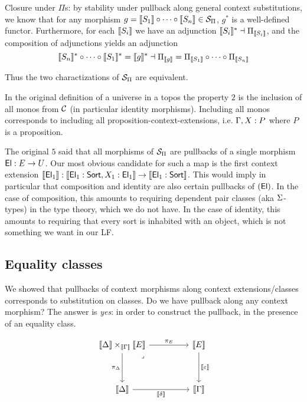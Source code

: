 Closure under $\Pi$s: by stability under pullback along general context substitutions,
we know that for any morphism $g = \llbracket S_{1} \rrbracket \circ \cdots \circ \llbracket S_{n} \rrbracket \in \mathcal{S}_{\Pi}$,
$g^{*}$ is a well-defined functor.
Furthermore, for each $\llbracket S_{i} \rrbracket$ we have an adjunction $\llbracket S_{i} \rrbracket^{*} \dashv \Pi_{\llbracket S_{i} \rrbracket}$,
and the composition of adjunctions %
yields an adjunction
\[\llbracket S_{n} \rrbracket^{*} \circ \cdots \circ \llbracket S_{1} \rrbracket^{*}=
  \llbracket g \rrbracket^{*} \dashv \Pi_{\llbracket g \rrbracket} = \Pi_{\llbracket S_{1} \rrbracket} \circ \cdots \circ \Pi_{\llbracket S_{n} \rrbracket}\]

Thus the two charactizations of $\mathcal{S}_{\Pi}$ are equivalent.

\begin{rmk}

In the original definition of a universe in a topos \cite{streicher} the property
$2$ is the inclusion of all monos from $\mathcal{C}$ (in particular identity morphisms).
Including all monos corresponds to including all proposition-context-extensions,
i.e. $\Gamma,X : P$ where $P$ is a proposition.

The original $5$ said that all morphisms of $\mathcal{S}_{\Pi}$ are pullbacks of a single morphism
$\mathsf{El} : E \to U$.
Our most obvious candidate for such a map is the first context extension
$\llbracket \mathsf{El}_{1} \rrbracket : \llbracket \mathsf{El}_{1} : \mathsf{Sort},X_{1} : \mathsf{El}_{1} \rrbracket \to \llbracket \mathsf{El}_{1} : \mathsf{Sort} \rrbracket$.
This would imply in particular that composition and identity are also certain pullbacks of $\left(\mathsf{El}\right)$.
In the case of composition, this amounts to requiring dependent pair classes (aka $\Sigma$-types) in the type theory,
which we do not have.
In the case of identity, this amounts to requiring that every sort is inhabited with an object,
which is not something we want in our LF.
\end{rmk}

\subsection{Equality classes}
We showed that pullbacks of context morphisms along context extensions/classes
corresponds to substitution on classes.
Do we have pullback along any context morphism?
The answer is \textit{yes}: in order to construct the pullback,
in the presence of an equality class.

\[\begin{tikzcd}
  {\bbrkt{\De} \times_{\bbrkt{\Ga}} \bbrkt{E}} && \bbrkt{E} \\
  \\
  \bbrkt{\De} && \bbrkt{\Ga}
  \arrow["\pi_{E}", from=1-1, to=1-3]
  \arrow["\bbrkt{\de}"', from=3-1, to=3-3]
  \arrow["\bbrkt{\ep}", from=1-3, to=3-3]
  \arrow["\pi_{\De}"', from=1-1, to=3-1]
  \arrow["\lrcorner"{anchor=center, pos=0.125}, draw=none, from=1-1, to=3-3]
\end{tikzcd}\]

